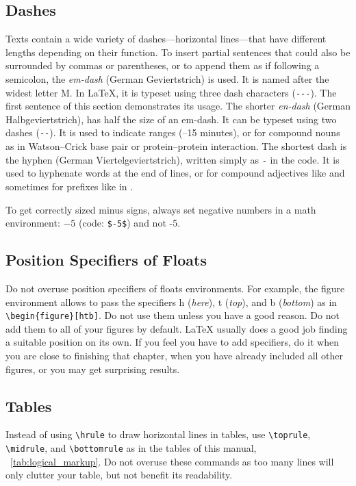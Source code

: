 \subsection{Dashes}

Texts contain a wide variety of dashes---\ie horizontal lines---that have
different lengths depending on their function. To insert partial sentences
that could also be surrounded by commas or parentheses, or to append them as
if following a semicolon, the \emph{em-dash} (German Geviertstrich) is used.
It is named after the widest letter M.  In \LaTeX{}, it is typeset using three
dash characters (\verb!---!).  The first sentence of this section demonstrates
its usage. The shorter \emph{en-dash} (German Halbgeviertstrich), has half the
size of an em-dash. It can be typeset using two dashes (\verb!--!). It is used
to indicate ranges (--15 minutes), or for compound nouns as in
Watson--Crick base pair or protein--protein interaction. The shortest dash is
the hyphen (German Viertelgeviertstrich), written simply as \verb!-! in the
code. It is used to hyphenate words at the end of lines, or for compound
adjectives like  and sometimes for prefixes like in
.

To get correctly sized minus signs, always set negative numbers in a math
environment: $-5$ (code: \verb!$-5$!) and not -5.

\subsection{Position Specifiers of Floats}

Do not overuse position specifiers of floats environments. For example, the
figure environment allows to pass the specifiers h (\emph{here}), t
(\emph{top}), and b (\emph{bottom}) as in \verb!\begin{figure}[htb]!. Do not
use them unless you have a good reason. Do not add them to all of your figures
by default. \LaTeX{} usually does a good job finding a suitable position on
its own. If you feel you have to add specifiers, do it when you are close to
finishing that chapter, when you have already included all other figures, or
you may get surprising results.

\subsection{Tables}

Instead of using \verb!\hrule! to draw horizontal lines in tables, use
\verb!\toprule!, \verb!\midrule!, and \verb!\bottomrule! as in the tables of
this manual, \eg~\autoref{tab:logical_markup}. Do not overuse these commands
as too many lines will only clutter your table, but not benefit its
readability.


